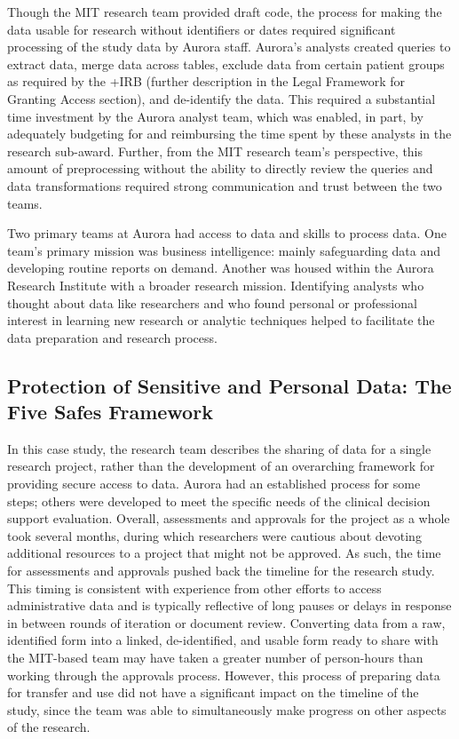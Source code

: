 \documentclass[
]{WileySix}
\begin{document}
Though the MIT research team provided draft code, the process for making the data usable for research without identifiers or dates required significant processing of the study data by Aurora staff. Aurora's analysts created queries to extract data, merge data across tables, exclude data from certain patient groups as required by the +IRB\textbar{} (further description in the Legal Framework for Granting Access section), and de-identify the data. This required a substantial time investment by the Aurora analyst team, which was enabled, in part, by adequately budgeting for and reimbursing the time spent by these analysts in the research sub-award. Further, from the MIT research team's perspective, this amount of preprocessing without the ability to directly review the queries and data transformations required strong communication and trust between the two teams.

Two primary teams at Aurora had access to data and skills to process data. One team's primary mission was business intelligence: mainly safeguarding data and developing routine reports on demand. Another was housed within the Aurora Research Institute with a broader research mission. Identifying analysts who thought about data like researchers and who found personal or professional interest in learning new research or analytic techniques helped to facilitate the data preparation and research process.

\hypertarget{protection-of-sensitive-and-personal-data-the-five-safes-framework-4}{%
\subsection{Protection of Sensitive and Personal Data: The Five Safes Framework}\label{protection-of-sensitive-and-personal-data-the-five-safes-framework-4}}

In this case study, the research team describes the sharing of data for a single research project, rather than the development of an overarching framework for providing secure access to data. Aurora had an established process for some steps; others were developed to meet the specific needs of the clinical decision support evaluation. Overall, assessments and approvals for the project as a whole took several months, during which researchers were cautious about devoting additional resources to a project that might not be approved. As such, the time for assessments and approvals pushed back the timeline for the research study. This timing is consistent with experience from other efforts to access administrative data and is typically reflective of long pauses or delays in response in between rounds of iteration or document review. Converting data from a raw, identified form into a linked, de-identified, and usable form ready to share with the MIT-based team may have taken a greater number of person-hours than working through the approvals process. However, this process of preparing data for transfer and use did not have a significant impact on the timeline of the study, since the team was able to simultaneously make progress on other aspects of the research.
\end{document}
